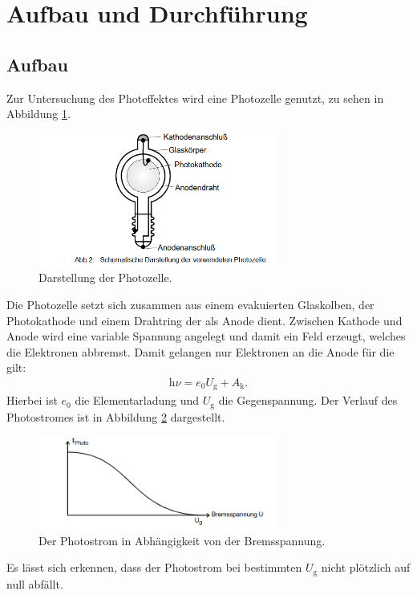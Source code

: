 \section{Aufbau und Durchführung}
\label{sec:Durchführung}
\subsection{Aufbau}
Zur Untersuchung des Photeffektes wird eine Photozelle genutzt, zu sehen in Abbildung \ref{fig:photozelle}.
\begin{figure}
 \centering
 \includegraphics[width=0.7\textwidth]{photozelle.png}
 \caption{Darstellung der Photozelle.\cite{sample}}
 \label{fig:photozelle}
\end{figure}
Die Photozelle setzt sich zusammen aus einem evakuierten Glaskolben, der Photokathode und einem Drahtring der als Anode dient.
Zwischen Kathode und Anode wird eine variable Spannung angelegt und damit ein Feld erzeugt, welches die Elektronen abbremst.
Damit gelangen nur Elektronen an die Anode für die gilt:
\begin{align}
\mathrm{h}\nu=e_\mathrm{0}U_\mathrm{g}+A_\mathrm{k}.\label{eqn:??}
\end{align}
Hierbei ist $e_\mathrm{0}$ die Elementarladung und $U_\mathrm{g}$ die Gegenspannung.
Der Verlauf des Photostromes ist in Abbildung \ref{fig:ps} dargestellt.
\begin{figure}
 \centering
 \includegraphics[width=0.7\textwidth]{ps.png}
 \caption{Der Photostrom in Abhängigkeit von der Bremsspannung.\cite{sample}}
 \label{fig:ps}
\end{figure}
Es lässt sich erkennen, dass der Photostrom bei bestimmten $U_\mathrm{g}$ nicht plötzlich auf null abfällt.
